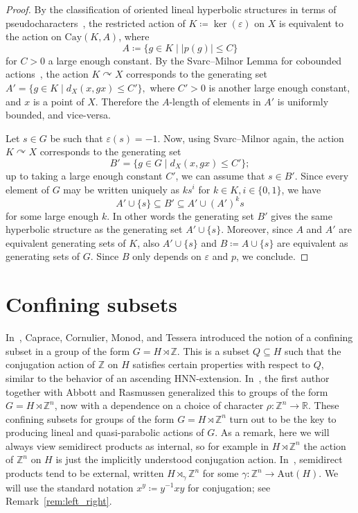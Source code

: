 \documentclass[10pt,a4paper]{article}
\theoremstyle{definition}
\theoremstyle{remark}
\newcommand{\Z}{\mathbb{Z}}
\newcommand{\R}{\mathbb{R}}
\newcommand{\Aut}{\mathrm{Aut}}
\newcommand{\Cay}{\mathrm{Cay}}
\theoremstyle{plain}
\begin{document}
\begin{proof}
By the classification of oriented lineal hyperbolic structures in terms of pseudocharacters~\cite[Section 2.3]{ABO}, the restricted action of $K \coloneqq \ker(\varepsilon)$ on $X$ is equivalent to the action on $\Cay(K, A)$, where
\[A \coloneqq \{ g \in K \mid |p(g)| \leq C \}\]
for $C > 0$ a large enough constant. By the Svarc--Milnor Lemma for cobounded actions~\cite[Lemma 3.11]{ABO}, the action $K \curvearrowright X$ corresponds to the generating set
\(A' = \{ g \in K \mid d_X(x, gx) \leq C' \},\)
where $C' > 0$ is another large enough constant, and $x$ is a point of $X$. Therefore the $A$-length of elements in $A'$ is uniformly bounded, and vice-versa.

Let $s \in G$ be such that $\varepsilon(s) = -1$. Now, using Svarc--Milnor again, the action $K \curvearrowright X$ corresponds to the generating set
\[B' = \{ g \in G \mid d_X(x, gx) \leq C' \};\]
up to taking a large enough constant $C'$, we can assume that $s \in B'$. Since every element of $G$ may be written uniquely as $ks^i$ for $k \in K, i \in \{0, 1\}$, we have
\[A' \cup \{ s \} \subseteq B' \subseteq A' \cup (A')^k s \]
for some large enough $k$. In other words the generating set $B'$ gives the same hyperbolic structure as the generating set $A' \cup \{ s \}$. Moreover, since $A$ and $A'$ are equivalent generating sets of $K$, also $A' \cup \{ s \}$ and $B \coloneqq A \cup \{ s \}$ are equivalent as generating sets of $G$. Since $B$ only depends on $\varepsilon$ and $p$, we conclude.
\end{proof}

\section{Confining subsets}\label{sec:confining}

In~\cite{caprace15}, Caprace, Cornulier, Monod, and Tessera introduced the notion of a confining subset in a group of the form $G=H\rtimes \Z$. This is a subset $Q\subseteq H$ such that the conjugation action of $\Z$ on $H$ satisfies certain properties with respect to $Q$, similar to the behavior of an ascending HNN-extension. In~\cite{confining}, the first author together with Abbott and Rasmussen generalized this to groups of the form $G=H\rtimes\Z^n$, now with a dependence on a choice of character $\rho\colon \Z^n\to\R$. These confining subsets for groups of the form $G=H\rtimes\Z^n$ turn out to be the key to producing lineal and quasi-parabolic actions of $G$. As a remark, here we will always view semidirect products as internal, so for example in $H\rtimes\Z^n$ the action of $\Z^n$ on $H$ is just the implicitly understood conjugation action. In~\cite{caprace15,confining}, semidirect products tend to be external, written $H\rtimes_\gamma\Z^n$ for some $\gamma\colon \Z^n\to\Aut(H)$. We will use the standard notation $x^y\coloneqq y^{-1}xy$ for conjugation; see Remark~\ref{rem:left_right}.
\end{document}
